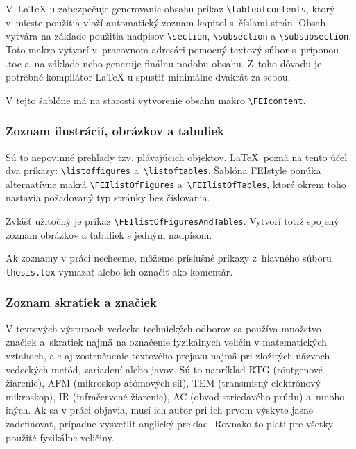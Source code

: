 V~\LaTeX-u zabezpečuje generovanie obsahu príkaz \verb|\tableofcontents|,
ktorý v~mieste použitia vloží automatický zoznam kapitol s~číslami strán.
Obsah vytvára na základe použitia nadpisov \verb|\section|,
\verb|\subsection| a \verb|\subsubsection|.
Toto makro vytvorí v~pracovnom adresári pomocný textový súbor
s~príponou .toc a~na základe neho generuje finálnu podobu obsahu.
Z~toho dôvodu je potrebné kompilátor \LaTeX-u
spustiť minimálne dvakrát za sebou.

V tejto šablóne má na starosti vytvorenie obsahu makro \verb|\FEIcontent|.

\subsubsection*{\normalsize Zoznam ilustrácií,
obrázkov a tabuliek}
Sú to nepovinné prehľady tzv. plávajúcich objektov.
\LaTeX\ pozná na tento účel dva príkazy: \verb|\listoffigures| a~\verb|\listoftables|. Šablóna FEIstyle ponúka alternatívne makrá \verb|\FEIlistOfFigures| a~\verb|\FEIlistOfTables|, ktoré okrem toho nastavia požadovaný typ stránky bez číslovania.

Zvlášť užitočný je príkaz \verb|\FEIlistOfFiguresAndTables|.
Vytvorí totiž spojený zoznam obrázkov a tabuliek s jedným nadpisom.

Ak zoznamy v práci nechceme, môžeme príslušné príkazy z~hlavného súboru \verb|thesis.tex| vymazať alebo ich označiť ako komentár.

\subsubsection*{\normalsize Zoznam skratiek a značiek}
V textových výstupoch vedecko-technických odborov sa používa
množstvo značiek a~skratiek najmä na označenie fyzikálnych
veličín v matematických vzťahoch,
ale aj zostručnenie textového prejavu najmä pri zložitých názvoch
vedeckých metód, zariadení alebo javov.
Sú to napríklad RTG (röntgenové žiarenie),
AFM (mikroskop atómových síl),
TEM (transmisný elektrónový mikroskop),
IR (infračervené žiarenie),
AC (obvod striedavého prúdu) a~mnoho iných.
Ak sa v práci objavia, musí ich autor pri ich prvom výskyte
jasne zadefinovať,
prípadne vysvetliť anglický preklad.
Rovnako to platí pre všetky použité fyzikálne veličiny.

